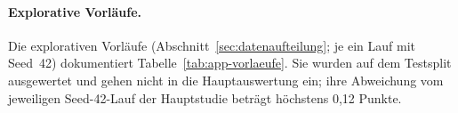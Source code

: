 \paragraph{Explorative Vorläufe.}
Die explorativen Vorläufe (Abschnitt~\ref{sec:datenaufteilung}; je ein
Lauf mit Seed~42) dokumentiert Tabelle~\ref{tab:app-vorlaeufe}.
Sie wurden auf dem Testsplit ausgewertet und gehen nicht in die
Hauptauswertung ein; ihre Abweichung vom jeweiligen Seed-42-Lauf der Hauptstudie
beträgt höchstens 0,12 Punkte.

\begin{table}[ht]
  \centering
  \footnotesize
  \caption[Explorative Vorläufe]{Explorative Vorläufe (Seed~42) und ihr
  Mikro-F$_1$ auf dem MultiNERD-Testsplit (256 Ausgabetokens) gegenüber
  dem Seed-42-Lauf der Hauptstudie; die Spalte GPU nennt die GPU der
  Testinferenz.}
  \label{tab:app-vorlaeufe}
  \setlength{\tabcolsep}{4pt}
  
\end{table}

